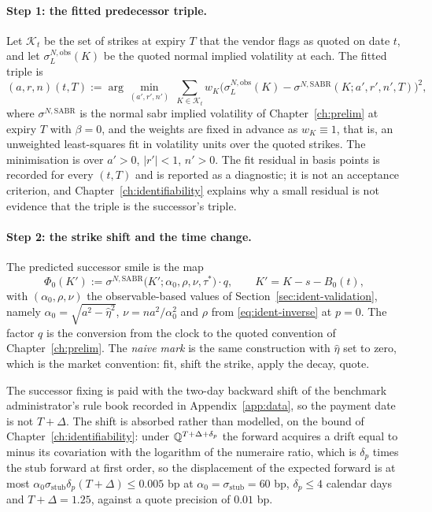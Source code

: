 \documentclass[../../../main.tex]{subfiles}
\begin{document}
\paragraph{Step 1: the fitted predecessor triple.} Let $\mathcal K_t$ be the set of strikes at expiry $T$ that the vendor flags as quoted on date $t$, and let $\sigma^{N,\mathrm{obs}}_L(K)$ be the quoted normal implied volatility at each. The fitted triple is
\[
(a,r,n)(t,T):=\arg\min_{(a',r',n')}\ \sum_{K\in\mathcal K_t}w_K\Big(\sigma^{N,\mathrm{obs}}_L(K)-\sigma^{N,\mathrm{SABR}}(K;a',r',n',T)\Big)^2 ,
\]
where $\sigma^{N,\mathrm{SABR}}$ is the normal \gls{sabr} implied volatility of Chapter~\ref{ch:prelim} at expiry $T$ with $\beta=0$, and the weights are fixed in advance as $w_K\equiv1$, that is, an unweighted least-squares fit in volatility units over the quoted strikes. The minimisation is over $a'>0$, $|r'|<1$, $n'>0$. The fit residual in basis points is recorded for every $(t,T)$ and is reported as a diagnostic; it is not an acceptance criterion, and Chapter~\ref{ch:identifiability} explains why a small residual is not evidence that the triple is the successor's triple.

\paragraph{Step 2: the strike shift and the time change.} The predicted successor smile is the map
\[
\Phi_0(K'):=\sigma^{N,\mathrm{SABR}}\big(K'; \alpha_0,\rho,\nu,\tau^*\big)\cdot q ,\qquad K'=K-s-B_0(t),
\]
with $(\alpha_0,\rho,\nu)$ the observable-based values of Section~\ref{sec:ident-validation}, namely $\alpha_0=\sqrt{a^2-\hat\eta^2}$, $\nu=na^2/\alpha_0^2$ and $\rho$ from \eqref{eq:ident-inverse} at $p=0$. The factor $q$ is the conversion from the clock to the quoted convention of Chapter~\ref{ch:prelim}. The \emph{naive mark} is the same construction with $\hat\eta$ set to zero, which is the market convention: fit, shift the strike, apply the decay, quote.

The successor fixing is paid with the two-day backward shift of the benchmark administrator's rule book recorded in Appendix~\ref{app:data}, so the payment date is not $T+\Delta$. The shift is absorbed rather than modelled, on the bound of Chapter~\ref{ch:identifiability}: under $\mathbb{Q}^{T+\Delta+\delta_p}$ the forward acquires a drift equal to minus its covariation with the logarithm of the numeraire ratio, which is $\delta_p$ times the stub forward at first order, so the displacement of the expected forward is at most $\alpha_0\sigma_{\mathrm{stub}}\delta_p(T+\Delta)\le0.005$ bp at $\alpha_0=\sigma_{\mathrm{stub}}=60$ bp, $\delta_p\le4$ calendar days and $T+\Delta=1.25$, against a quote precision of $0.01$ bp.
\end{document}
